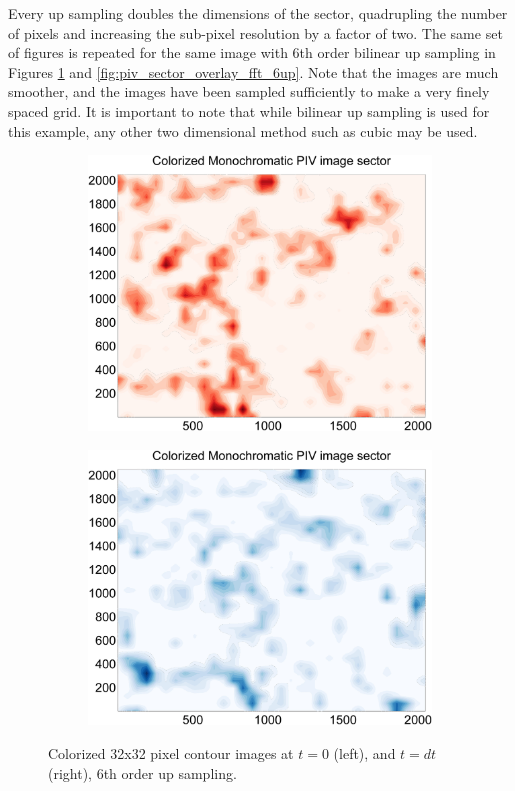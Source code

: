 Every up sampling doubles the dimensions of the sector, quadrupling the number 
of pixels and increasing the sub-pixel resolution by a factor of two. The same 
set of figures is repeated for the same image with 6th order bilinear up 
sampling in Figures \ref{fig:piv_sector_6up} and
\ref{fig:piv_sector_overlay_fft_6up}. Note that the images are much smoother, 
and the images have been sampled sufficiently to make a very finely spaced grid.
It is important to note that while bilinear up sampling is used for this
example, any other two dimensional method such as cubic may be used.

\vspace{32pt}
\begin{figure}[H]
	\begin{subfigure}{.49\textwidth}
		\centering
		\includegraphics[width=.9\linewidth]{figs/piv_method/pive_figa_order6}
	\end{subfigure} 
	\begin{subfigure}{.49\textwidth}
		\centering
		\includegraphics[width=.9\linewidth]{figs/piv_method/pive_figb_order6}
	\end{subfigure}	
	\caption{Colorized 32x32 pixel contour images at $t=0$ (left), and $t=dt$ 
		(right), 6th order up sampling.}
	\label{fig:piv_sector_6up}
\end{figure}
